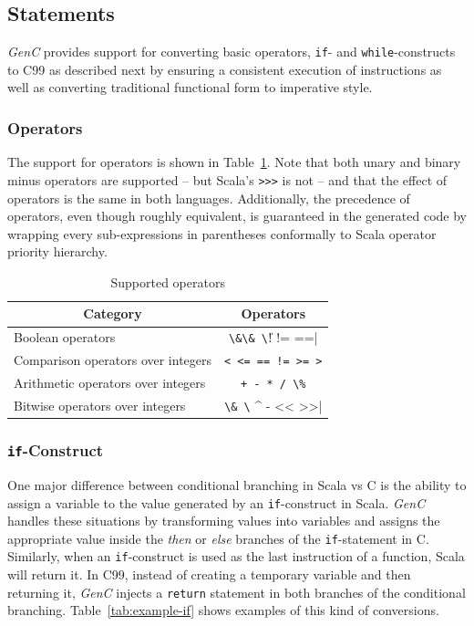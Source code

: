 \documentclass{article}
\newcommand{\inlinecode}[1]{\lstinline[basicstyle=\ttfamily]|#1|}
\newcommand{\inlineC}[1]{\lstinline[language=C99]|#1|}
\newcommand{\inlineScala}[1]{\lstinline[language=MyScala]|#1|}
\newcommand{\heading}[1]{\multicolumn{1}{c}{\textbf{#1}}}
\newcommand{\GenC}{\emph{GenC}\xspace}
\begin{document}
\subsection{Statements}

\GenC provides support for converting basic operators, \inlinecode{if}- and
\inlinecode{while}-constructs to C99 as described next by ensuring a consistent
execution of instructions as well as converting traditional functional form to
imperative style.



\subsubsection{Operators}

The support for operators is shown in Table~\ref{tab:operators}. Note that both
unary and binary minus operators are supported -- but Scala's \inlineScala{>>>}
is not -- and that the effect of operators is the same in both languages.
Additionally, the precedence of operators, even though roughly equivalent, is
guaranteed in the generated code by wrapping every sub-expressions in
parentheses conformally to Scala operator priority hierarchy.

\begin{table}[h]
  \centering
  \begin{tabular}{lc}
    \toprule
    \heading{Category}                 & \heading{Operators}         \\
    \midrule
    Boolean operators                  & \inlineC{\&\& \|\| ! != ==} \\
    Comparison operators over integers & \inlineC{< <= == != >= >}   \\
    Arithmetic operators over integers & \inlineC{+ - * / \%}        \\
    Bitwise operators over integers    & \inlineC{\& \| ^ - << >>}   \\
    \bottomrule
  \end{tabular}
  \caption{Supported operators}
  \label{tab:operators}
\end{table}



\subsubsection{\inlinecode{if}-Construct}

One major difference between conditional branching in Scala vs C is the ability
to assign a variable to the value generated by an \inlineScala{if}-construct in
Scala. \GenC handles these situations by transforming values into variables and
assigns the appropriate value inside the \textit{then} or \textit{else} branches
of the \inlineC{if}-statement in C. Similarly, when an
\inlineScala{if}-construct is used as the last instruction of a function, Scala
will return it. In C99, instead of creating a temporary variable and then
returning it, \GenC injects a \inlineC{return} statement in both branches of the
conditional branching. Table~\ref{tab:example-if} shows examples of this kind of
conversions.
\end{document}
